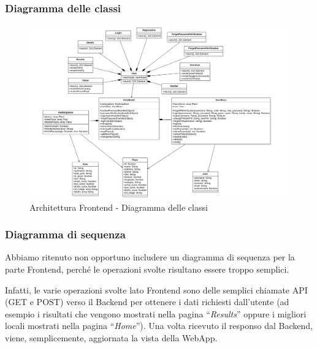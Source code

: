 \subsubsection{Diagramma delle classi}

\begin{figure}[H]
    \centerfloat
    \includegraphics[scale=0.5]{Contenuto/Immagini/DiagrammaClassiFrontEnd.png}
    \caption{Architettura Frontend - Diagramma delle classi}
\end{figure}

\subsubsection{Diagramma di sequenza}

Abbiamo ritenuto non opportuno includere un diagramma di sequenza per la parte Frontend, perché le operazioni svolte risultano essere troppo semplici.

Infatti, le varie operazioni svolte lato Frontend sono delle semplici chiamate API (GET e POST) verso il Backend per ottenere i dati richiesti dall'utente (ad esempio i risultati che vengono mostrati nella pagina “\textit{Results}” oppure i migliori locali mostrati nella pagina “\textit{Home}”). Una volta ricevuto il responso dal Backend, viene, semplicemente, aggiornata la vista della WebApp.
